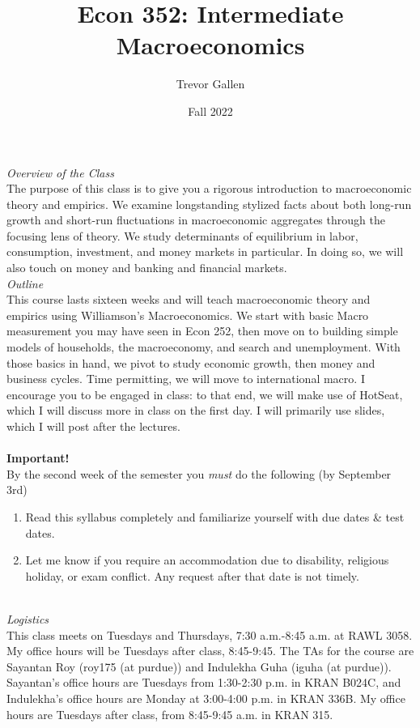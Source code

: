 \documentclass[a4paper]{article}
\title{Econ 352: Intermediate Macroeconomics}
\author{Trevor Gallen}
\date{Fall 2022}
\begin{document}


\maketitle
\emph{Overview of the Class}\\
The purpose of this class is to give you a rigorous introduction to macroeconomic theory and empirics.  We examine longstanding stylized facts about both long-run growth and short-run fluctuations in macroeconomic aggregates through the focusing lens of theory.  We study determinants of equilibrium in labor, consumption, investment, and money markets in particular.  In doing so, we will also touch on money and banking and financial markets.\\


\emph{Outline}\\
This course lasts sixteen weeks and will teach macroeconomic theory and empirics using Williamson's Macroeconomics. We start with basic Macro measurement you may have seen in Econ 252, then move on to building simple models of households, the macroeconomy, and search and unemployment.  With those basics in hand, we pivot to study economic growth, then money and business cycles.  Time permitting, we will move to international macro.  I encourage you to be engaged in class: to that end, we will make use of HotSeat, which I will discuss more in class on the first day.  I will primarily use slides, which I will post after the lectures.
\\
\ \\
\textbf{Important!}\\
By the second week of the semester you \emph{must} do the following (by September 3rd)
\begin{enumerate}
\item Read this syllabus completely and familiarize yourself with due dates \& test dates.
\item Let me know if you require an accommodation due to disability, religious holiday, or exam conflict.  Any request after that date is not timely.
\end{enumerate}
\ \\
\emph{Logistics}\\
This class meets on Tuesdays and Thursdays, 7:30 a.m.-8:45 a.m. at RAWL 3058.  My office hours will be Tuesdays after class, 8:45-9:45.  The TAs for the course are Sayantan Roy (roy175 (at purdue)) and Indulekha Guha (iguha  (at purdue)).  Sayantan's office hours are Tuesdays from 1:30-2:30 p.m. in KRAN B024C, and Indulekha's office hours are Monday at 3:00-4:00 p.m. in KRAN 336B.  My office hours are Tuesdays after class, from 8:45-9:45 a.m. in KRAN 315.\ \\
\end{document}
